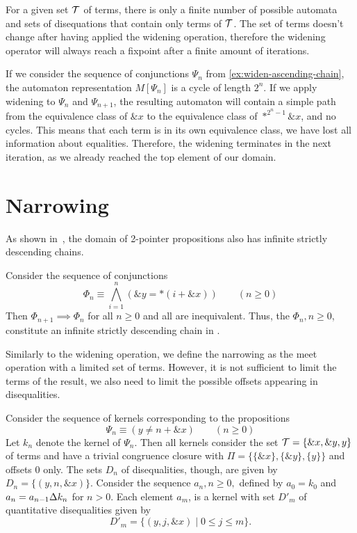 For a given set $\mathcal{T}$ of terms, there is only a finite number of possible automata and sets of disequations that contain only terms of $\mathcal{T}$.
The set of terms doesn't change after having applied the widening operation, therefore the widening operator will always reach a fixpoint after a finite amount of iterations.

\begin{example}\label{ex:widen}
  If we consider the sequence of conjunctions $\Psi_n$ from \cref{ex:widen-ascending-chain}, the automaton representation $M[\Psi_n]$ is a cycle of length $2^n$.
  If we apply widening to $\Psi_n$ and $\Psi_{n+1}$, the resulting automaton will contain a simple path from the equivalence class of $\&x$ to the equivalence class of $*^{2^{n}-1}\&x$,
  and no cycles.
  This means that each term is in its own equivalence class, we have lost all information about equalities.
  Therefore, the widening terminates in the next iteration,
  as we already reached the top element of our domain.
\end{example}

\section{Narrowing}

As shown in~\cite{2pointer}, the domain of 2-pointer propositions also has infinite strictly descending chains.

\begin{example}
	Consider the sequence of conjunctions
	\[
	\Phi_n \equiv\bigwedge_{i=1}^n (\&y = *(i+\&x))\qquad(n\geq 0)
	\]
	Then $\Phi_{n+1}\implies\Phi_n$ for all $n\geq 0$ and all are inequivalent.
	Thus, the $\Phi_n,n\geq 0$, constitute an infinite strictly descending chain in \cpo.
\end{example}

Similarly to the widening operation, we define the narrowing as the meet operation with a limited set of terms.
However, it is not sufficient to limit the terms of the result, we also need to limit the possible offsets
appearing in disequalities.

\begin{example}\label{e:narrow1}
	Consider the sequence of kernels corresponding to the propositions
	\[
	\Psi_n \equiv (y\neq n+\&x)\qquad(n\geq 0)
	\]
	Let $k_n$ denote the kernel of $\Psi_n$. Then all kernels consider the set $\mathcal{T}=\{\&x,\&y,y\}$ of terms
	and have a trivial congruence closure with $\Pi=\{\{\&x\},\{\&y\},\{y\}\}$ and offsets 0 only.
	The sets $D_n$ of disequalities, though, are given by $D_n=\{(y,n,\&x)\}$. Consider
	the sequence $a_n, n\geq 0,$ defined by $a_0 = k_0$ and $a_n = a_{n-1}\Delta k_n$ for $n>0$. Each element $a_m$, is
	a kernel with set $D'_m$ of quantitative disequalities given by
	\[
	D'_m = \{(y,j,\&x)\mid 0\leq j\leq m\}.
	\]
\end{example}

